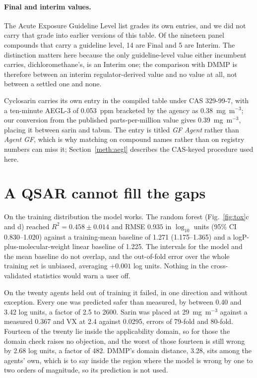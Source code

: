 \documentclass[11pt,a4paper]{article}
\begin{document}


\paragraph{Final and interim values.} The Acute Exposure Guideline Level list
grades its own entries, and we did not carry that grade into earlier versions of
this table. Of the nineteen panel compounds that carry a guideline level, 14 are
Final and 5 are Interim. The distinction matters here because the only
guideline-level value either incumbent carries, dichloromethane's, is an Interim
one; the comparison with DMMP is therefore between an interim regulator-derived
value and no value at all, not between a settled one and none.


Cyclosarin carries its own entry in the compiled table under CAS 329-99-7, with
a ten-minute AEGL-3 of 0.053~ppm bracketed by the agency as 0.38~mg~m$^{-3}$;
our conversion from the published parts-per-million value gives
0.39~mg~m$^{-3}$, placing it between sarin and tabun. The entry is titled
\textit{GF Agent} rather than \textit{Agent GF}, which is why matching on
compound names rather than on registry numbers can miss it;
Section~\ref{meth:aegl} describes the CAS-keyed procedure used here.

\section{A QSAR cannot fill the gaps}
\label{res:qsar}

On the training distribution the model works. The random forest
(Fig.~\ref{fig:tox}c and d) reached $R^{2}=0.458 \pm 0.014$ and RMSE $0.935$ in
$\log_{10}$ units (95\% CI 0.830--1.020) against a training-mean baseline of
1.271 (1.175--1.365) and a logP-plus-molecular-weight linear baseline of 1.225.
The intervals for the model and the mean baseline do not overlap, and the
out-of-fold error over the whole training set is unbiased, averaging $+0.001$ log
units. Nothing in the cross-validated statistics would warn a user off.

On the twenty agents held out of training it failed, in one direction and without
exception. Every one was predicted safer than measured, by between 0.40 and 3.42
log units, a factor of 2.5 to 2600. Sarin was placed at 29~mg~m$^{-3}$ against a
measured 0.367 and VX at 2.4 against 0.0295, errors of 79-fold and 80-fold.
Fourteen of the twenty lie inside the applicability domain, so for those the
domain check raises no objection, and the worst of those fourteen is still wrong
by 2.68 log units, a factor of 482. DMMP's domain distance, 3.28, sits among the
agents' own, which is to say inside the region where the model is wrong by one to
two orders of magnitude, so its prediction is not used.
\end{document}
